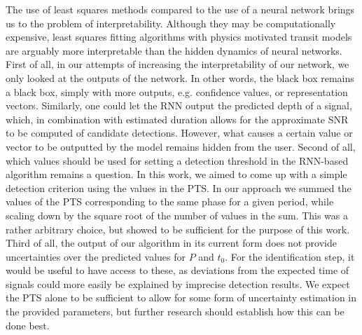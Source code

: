 The use of least squares methods compared to the use of a neural network brings us to the problem of interpretability. Although they may be computationally expensive, least squares fitting algorithms with physics motivated transit models are arguably more interpretable than the hidden dynamics of neural networks. First of all, in our attempts of increasing the interpretability of our network, we only looked at the outputs of the network. In other words, the black box remains a black box, simply with more outputs, e.g. confidence values, or representation vectors. Similarly, one could let the RNN output the predicted depth of a signal, which, in combination with estimated duration allows for the approximate SNR to be computed of candidate detections. However, what causes a certain value or vector to be outputted by the model remains hidden from the user. Second of all, which values should be used for setting a detection threshold in the RNN-based algorithm remains a question. In this work, we aimed to come up with a simple detection criterion using the values in the PTS. In our approach we summed the values of the PTS corresponding to the same phase for a given period, while scaling down by the square root of the number of values in the sum. This was a rather arbitrary choice, but showed to be sufficient for the purpose of this work.  Third of all, the output of our algorithm in its current form does not provide uncertainties over the predicted values for $P$ and $t_0$. For the identification step, it would be useful to have access to these, as deviations from the expected time of signals could more easily be explained by imprecise detection results. We expect the PTS alone to be sufficient to allow for some form of uncertainty estimation in the provided parameters, but further research should establish how this can be done best.